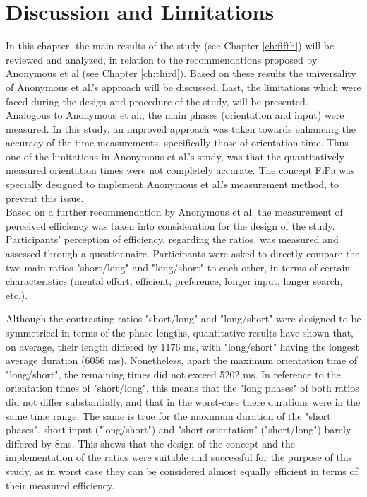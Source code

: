 
\chapter{Discussion and Limitations}\label{ch:sixth}

In this chapter, the main results of the study (see Chapter \ref{ch:fifth}) will be reviewed and analyzed, in relation to the recommendations proposed by Anonymous et al \cite{anonymous} (see Chapter \ref{ch:third}). Based on these results the universality of Anonymous et al.'s \cite{anonymous} approach will be discussed. Last, the limitations which were faced during the design and procedure of the study, will be presented.\\

Analogous to Anonymous et al., the main phases (orientation and input) were measured. In this study, an improved approach was taken towards enhancing the accuracy of the time measurements, specifically those of orientation time. Thus one of the limitations in Anonymous et al.'s \cite{anonymous} study, was that the quantitatively measured orientation times were not completely accurate. The concept FiPa was specially designed to implement Anonymous et al.'s \cite{anonymous} measurement method, to prevent this issue. \\
Based on a further recommendation by Anonymous et al. \cite{anonymous} the measurement of perceived efficiency was taken into consideration for the design of the study. Participants' perception of efficiency, regarding the ratios, was measured and assessed through a questionnaire. Participants were asked to directly compare the two main ratios "short/long" and "long/short" to each other, in terms of certain characteristics (mental effort, efficient, preference, longer input, longer search, etc.). 

Although the contrasting ratios "short/long" and "long/short" were designed to be symmetrical in terms of the phase lengths, quantitative results have shown that, on average, their length differed by 1176 ms, with "long/short" having the longest average duration (6056 ms). Nonetheless, apart the maximum orientation time of "long/short", the remaining times did not exceed 5202 ms. In reference to the orientation times of "short/long", this means that the "long phases" of both ratios did not differ substantially, and that in the worst-case there durations were in the same time range. The same is true for the maximum duration of the "short phases". short input ("long/short") and "short orientation" ("short/long") barely differed by 8ms. This shows that the design of the concept and the implementation of the ratios were suitable and successful for the purpose of this study, as in worst case they can be considered almost equally efficient in terms of their measured efficiency. \\

